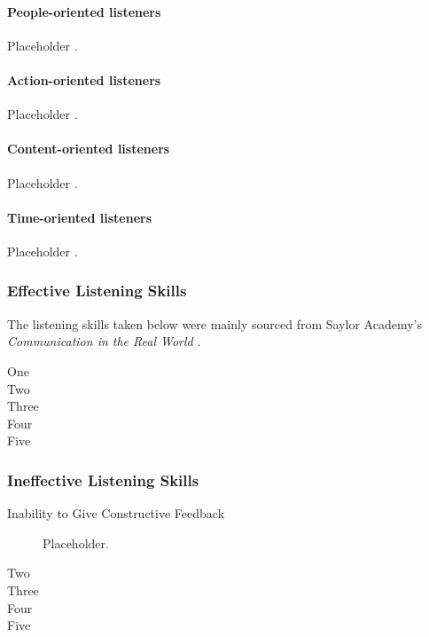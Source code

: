 \documentclass[stu,12pt]{apa7}
\begin{document}
        \paragraph{People-oriented listeners}
          Placeholder \parencite[pp. 338]{noauthor_communication_2013}.

        \paragraph{Action-oriented listeners}
          Placeholder \parencite[pp. 338--339]{noauthor_communication_2013}.

        \paragraph{Content-oriented listeners}
          Placeholder \parencite[pp. 339]{noauthor_communication_2013}.

        \paragraph{Time-oriented listeners}
          Placeholder \parencite[pp. 339--340]{noauthor_communication_2013}.


      \subsubsection{Effective Listening Skills}
        The listening skills taken below were mainly sourced from Saylor
          Academy's \textit{Communication in the Real World}
          \parencite[pp. 330--345]{noauthor_communication_2013}.

          \begin{description}
            \item[One]
            \item[Two]
            \item[Three]
            \item[Four]
            \item[Five]
          \end{description}

      \subsubsection{Ineffective Listening Skills}
          \begin{description}
            \item[Inability to Give Constructive Feedback]
              Placeholder.
            \item[Two]
            \item[Three]
            \item[Four]
            \item[Five]
          \end{description}
\end{document}
